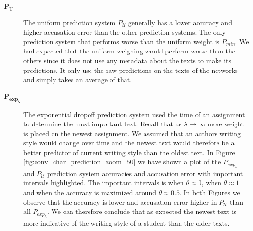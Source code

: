 \begin{description}

    \item[$\mathbf{P_\mathrm{U}}$]

        The uniform prediction system $P_\mathcal{U}$ generally has a lower
        accuracy and higher accusation error than the other prediction systems.
        The only prediction system that performs worse than the uniform weight
        is $P_{min}$. We had expected that the uniform weighing would perform
        worse than the others since it does not use any metadata about the texts
        to make its predictions. It only use the raw predictions on the texts of
        the networks and simply takes an average of that.

    \item[$\mathbf{P_{exp_\lambda}}$]

        The exponential dropoff prediction system used the time of an
        assignment to determine the most important text. Recall that
        as $\lambda \rightarrow \infty$ more weight is placed on the
        newest assignment. We assumed that an authors writing style would
        change over time and the newest text would therefore be a better
        predictor of current writing style than the oldest text. In Figure
        \ref{fig:conv_char_prediction_zoom_50} we have shown a plot of the
        $P_{exp_\lambda}$ and $P_\mathcal{U}$ prediction system accuracies and
        accusation error with important intervals highlighted. The important
        intervals is when $\theta \approx 0$, when $\theta \approx 1$ and when
        the accuracy is maximized around $\theta \approx 0.5$. In both Figures
        we observe that the accuracy is lower and accusation error higher in
        $P_\mathcal{U}$ than all $P_{exp_\lambda}$. We can therefore conclude
        that as expected the newest text is more indicative of the writing style
        of a student than the older texts.


\end{description}
